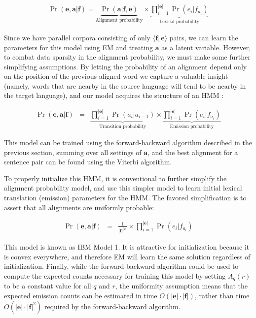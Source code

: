 \begin{eqnarray*}
\Pr(\textbf{e}, \textbf{a} | \textbf{f}) =  \underbrace{  \Pr(\textbf{a} | \textbf{f} , \textbf{e}) }_{\textrm{Alignment probability}} \times  \underbrace{ \prod_{i=1}^{|\textbf{e}|} \Pr(e_i|f_{a_i}) }_{\textrm{Lexical probability}}
\end{eqnarray*}

\noindent Since we have parallel corpora consisting of only $\langle
\textbf{f}, \textbf{e} \rangle$ pairs, we can learn the parameters for
this model using EM and treating $\textbf{a}$ as a latent variable.
However, to combat data sparsity in the alignment probability, we must
make some further simplifying assumptions.  By letting the probability
of an alignment depend only on the position of the previous aligned
word we capture a valuable insight (namely, words that are nearby in
the source language will tend to be nearby in the target language),
and our model acquires the structure of an HMM \cite{Vogel_1996}:

\begin{eqnarray*}
\Pr(\textbf{e}, \textbf{a} | \textbf{f}) & = & \underbrace{\prod_{i=1}^{|\textbf{e}|} \Pr(a_i | a_{i-1})}_{\textrm{Transition probability}} \times \underbrace{\prod_{i=1}^{|\textbf{e}|} \Pr(e_i|f_{a_i})}_{\textrm{Emission probability}} 
\end{eqnarray*}

\noindent This model can be trained using the forward-backward
algorithm described in the previous section, summing over all settings
of $\textbf{a}$, and the best alignment for a sentence pair can be
found using the Viterbi algorithm.

To properly initialize this HMM, it is conventional to further
simplify the alignment probability model, and use this simpler model
to learn initial lexical translation (emission) parameters for the
HMM.  The favored simplification is to assert that all alignments are
uniformly probable:

\begin{eqnarray*}
\Pr(\textbf{e}, \textbf{a} | \textbf{f}) & = & \frac{1}{|\textbf{f}|^{|\textbf{e}|}} \times \prod_{i=1}^{|\textbf{e}|} \Pr(e_i|f_{a_i}) 
\end{eqnarray*}

\noindent This model is known as IBM Model 1.  It is attractive for
initialization because it is convex everywhere, and therefore EM will
learn the same solution regardless of initialization.  Finally, while
the forward-backward algorithm could be used to compute the expected
counts necessary for training this model by setting $A_q(r)$ to be a
constant value for all $q$ and $r$, the uniformity assumption means
that the expected emission counts can be estimated in time
$O(|\textbf{e}| \cdot |\textbf{f}|)$, rather than time $O(|\textbf{e}|
\cdot |\textbf{f}|^2)$ required by the forward-backward algorithm.

